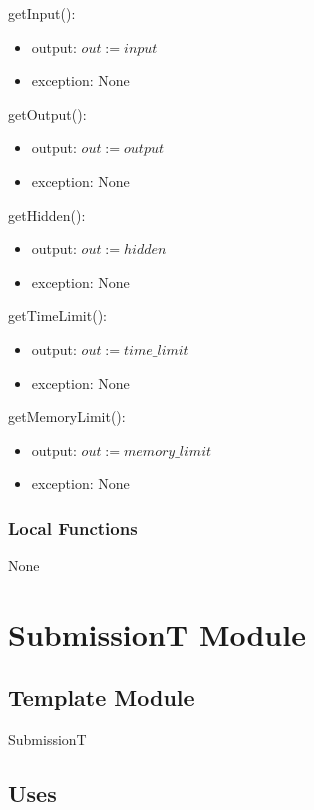 \documentclass[12pt, titlepage]{article}
\begin{document}
\noindent getInput():
\begin{itemize}
\item output: $out := input$
\item exception: None
\end{itemize}

\noindent getOutput():
\begin{itemize}
\item output: $out := output$
\item exception: None
\end{itemize}

\noindent getHidden():
\begin{itemize}
\item output: $out := hidden$
\item exception: None
\end{itemize}

\noindent getTimeLimit():
\begin{itemize}
\item output: $out := time\_limit$
\item exception: None
\end{itemize}

\noindent getMemoryLimit():
\begin{itemize}
\item output: $out := memory\_limit$
\item exception: None
\end{itemize}

\subsubsection{Local Functions}
None


\newpage

\section{SubmissionT Module} \label{SubmissionT} 

\subsection{Template Module}

SubmissionT

\subsection{Uses}

\end{document}
